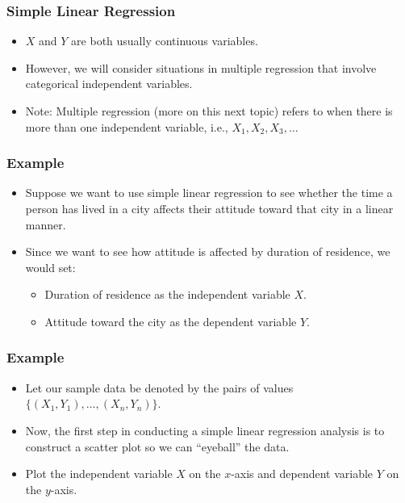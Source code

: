 \documentclass[12pt]{beamer}
\begin{document}
\begin{frame}
	\frametitle{\color{blue}Simple Linear Regression}
	
	
	\begin{itemize}[label={\color{blue}$\blacktriangleright$}]
		\item $X$ and $Y$ are both usually continuous variables.
		
		\item However, we will consider situations in multiple regression that involve categorical independent variables.
		
		\item Note: Multiple regression (more on this next topic) refers to when there is more than one independent variable, i.e., $X_1, X_2, X_3, \ldots$
	\end{itemize}
	
\end{frame}
\begin{frame}
	\frametitle{\color{blue}Example}
	
	
	\begin{itemize}[label={\color{blue}$\blacktriangleright$}]
		\item Suppose we want to use simple linear regression to see whether the time a person has lived in a city affects their attitude toward that city in a linear manner.
		
		\item Since we want to see how attitude is affected by duration of residence, we would set:
		\begin{itemize}[label={\color{blue}$\blacktriangleright$}]
			\item Duration of residence as the independent variable $X$.
			\item Attitude toward the city as the dependent variable $Y$.
		\end{itemize}
	\end{itemize}
	
\end{frame}
\begin{frame}
	\frametitle{\color{blue}Example}
	
	
	\begin{itemize}[label={\color{blue}$\blacktriangleright$}]
		\item Let our sample data be denoted by the pairs of values $\{(X_1, Y_1),\ldots,(X_n, Y_n)\}$.
		
		\item Now, the first step in conducting a simple linear regression analysis is to construct a scatter plot so we can ``eyeball'' the data.
		
		\item Plot the independent variable $X$ on the $x$-axis and dependent variable $Y$ on the $y$-axis.
	\end{itemize}
	
\end{frame}
\end{document}
